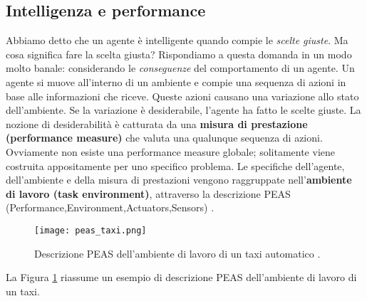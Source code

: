  \subsection{Intelligenza e performance}
 Abbiamo detto che un agente è intelligente quando compie le \emph{scelte giuste}. Ma cosa significa fare la scelta giusta?
 Rispondiamo a questa domanda in un modo molto banale: considerando le \emph{conseguenze} del comportamento di un agente.
 Un agente si muove all'interno di un ambiente e compie una sequenza di azioni in base alle informazioni che riceve.
 Queste azioni causano una variazione allo stato dell'ambiente. Se la variazione è desiderabile, l'agente ha fatto le scelte giuste.
 La nozione di desiderabilità è catturata da una \textbf{misura di prestazione (performance measure)} che valuta una qualunque sequenza di azioni.
 Ovviamente non esiste una performance measure globale; solitamente viene costruita appositamente  per uno specifico problema.
 Le specifiche dell'agente, dell'ambiente e della misura di prestazioni vengono raggruppate nell'\textbf{ambiente di lavoro (task environment)},
 attraverso la descrizione PEAS (Performance,Environment,Actuators,Sensors) \cite{aima}.
 \begin{figure}
  \texttt{[image: peas\_taxi.png]}
  \caption{Descrizione PEAS dell'ambiente di lavoro di un taxi automatico \cite{aima}.}
  \label{fig:taxi}
 \end{figure}
 La Figura \ref{fig:taxi} riassume un esempio di descrizione PEAS dell'ambiente di lavoro di un taxi.
